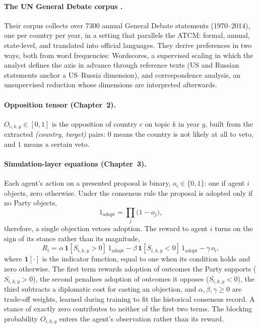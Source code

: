 \paragraph{The UN General Debate corpus \parencite{Baturo2017}.}
Their corpus collects over 7300 annual General Debate statements (1970--2014), one per country
per year, in a setting that parallels the ATCM: formal, annual, state-level, and translated into
official languages. They derive preferences in two ways, both from word frequencies: Wordscores, a
supervised scaling in which the analyst defines the axis in advance through reference texts (US
and Russian statements anchor a US--Russia dimension), and correspondence analysis, an
unsupervised reduction whose dimensions are interpreted afterwards.

\paragraph{Opposition tensor (Chapter~2).}
$O_{c,k,y} \in [0,1]$ is the opposition of country $c$ on topic $k$ in year $y$, built from the
extracted \emph{(country, target)} pairs: $0$ means the country is not likely at all
to veto, and $1$ means a certain veto.

\paragraph{Simulation-layer equations (Chapter~3).}
Each agent's action on a presented proposal is binary, $o_i \in \{0,1\}$: one if agent $i$
objects, zero otherwise. Under the consensus rule the proposal is adopted only if no Party
objects,
\begin{equation}
  1_{\mathrm{adopt}} = \prod_{j} \big(1 - o_j\big),
  \label{eq:adopt}
\end{equation}
therefore, a single objection vetoes adoption. The reward to agent $i$ turns on the sign of its
stance rather than its magnitude,
\begin{equation}
  R_i = \alpha\, \mathbf{1}[S_{i,k,y} > 0]\, 1_{\mathrm{adopt}}
      - \beta\, \mathbf{1}[S_{i,k,y} < 0]\, 1_{\mathrm{adopt}}
      - \gamma\, o_i,
  \label{eq:reward}
\end{equation}
where $\mathbf{1}[\cdot]$ is the indicator function, equal to one when its condition holds and
zero otherwise. The first term rewards adoption of outcomes the Party supports
($S_{i,k,y} > 0$), the second penalises adoption of outcomes it opposes ($S_{i,k,y} < 0$), the
third subtracts a diplomatic cost for casting an objection, and $\alpha, \beta, \gamma \ge 0$ are
trade-off weights, learned during training to fit the historical consensus record. A stance of
exactly zero contributes to neither of the first two terms. The blocking probability $O_{i,k,y}$
enters the agent's observation rather than its reward.

